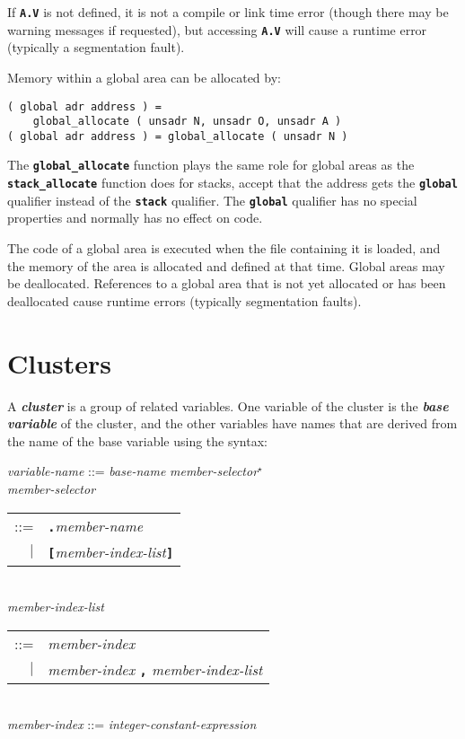 \documentclass[12pt]{article}
\newcommand{\TT}[1]{{\tt \bfseries #1}}
\newcommand{\key}[1]{{\bf \em #1}\index{#1}}
\newcommand{\mkey}[2]{{\bf \em #1}\index{#1!#2}}
\newenvironment{indpar}[1][0.3in]%
	{\begin{list}{}%
		     {\setlength{\itemsep}{0in}%
		      \setlength{\topsep}{0in}%
		      \setlength{\parsep}{1ex}%
		      \setlength{\labelwidth}{#1}%
		      \setlength{\leftmargin}{#1}%
		      \addtolength{\leftmargin}{\labelsep}}%
	 \item}%
	{\end{list}}
\begin{document}
If \TT{A.V} is not defined, it is not a compile or link time error
(though there may be warning messages if requested), but accessing
\TT{A.V} will cause a runtime error (typically a segmentation fault).


Memory within a global area can be allocated by:

\begin{indpar}\begin{verbatim}
( global adr address ) =
    global_allocate ( unsadr N, unsadr O, unsadr A )
( global adr address ) = global_allocate ( unsadr N )
\end{verbatim}\end{indpar}

The \TT{global\_allocate} function plays the same role for
global areas as the \TT{stack\_allo\-cate} function does for
stacks, accept that the address gets the \TT{global} qualifier
instead of the \TT{stack} qualifier.  The \TT{global} qualifier
has no special properties and normally has no effect on code.

The code of a global area is executed when the file containing it is
loaded, and the memory of the area is allocated and defined at that
time.  Global areas may be deallocated.  References to a global area
that is not yet allocated or has been deallocated cause runtime
errors (typically segmentation faults).

\section{Clusters}
\label{CLUSTERS}

A \key{cluster} is a group of related variables.  One variable of
the cluster is the \mkey{base variable}{of cluster} of the cluster, and the
other variables have names that are derived from the
name of the base variable using the syntax:


\begin{indpar}
{\em variable-name} ::=
    {\em base-name} {\em member-selector}$^\star$ \\[1ex]
{\em member-selector} \begin{tabular}[t]{@{}rl}
    ::= & \TT{.}{\em member-name} \\
    $|$ & \TT{[}{\em member-index-list}\TT{]}
    \end{tabular} \\[1ex]
{\em member-index-list} \begin{tabular}[t]{@{}rl}
    ::= & {\em member-index} \\
    $|$ & {\em member-index} \TT{,} {\em member-index-list}
    \end{tabular} \\[1ex]
{\em member-index} ::= {\em integer-constant-expression}
\end{indpar}
\end{document}
